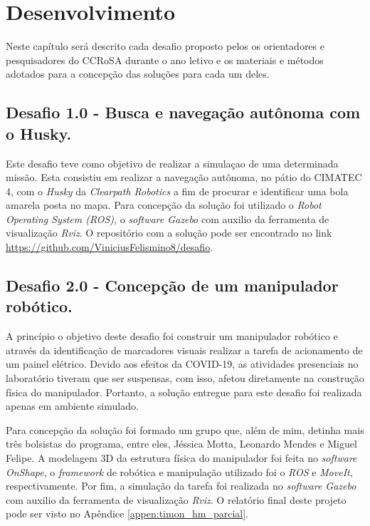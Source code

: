 \chapter{Desenvolvimento}
\label{chap:mat}

Neste capítulo será descrito cada desafio proposto pelos os orientadores e pesquisadores do CCRoSA durante o ano letivo e os materiais e métodos adotados para a concepção das soluções para cada um deles.

\section{Desafio 1.0 - Busca e navegação autônoma com o Husky.}

Este desafio teve como objetivo de realizar a simulaçao de uma determinada missão. Esta consistiu em realizar a navegação autônoma, no pátio do CIMATEC 4, com o \textit{Husky} da \textit{Clearpath Robotics} a fim de procurar e identificar uma bola amarela posta no mapa. Para concepção da solução foi utilizado o \textit{Robot Operating System (ROS)}, o \textit{software Gazebo} com auxilio da ferramenta de visualização \textit{Rviz}. O repositório com a solução pode ser encontrado no link \url{https://github.com/ViniciusFelismino8/desafio}.

\section{Desafio 2.0 - Concepção de um manipulador robótico.}
\label{sec:desafio2.0}

A princípio o objetivo deste desafio foi construir um manipulador robótico e através da identificação de marcadores visuais realizar a tarefa de acionamento de um painel elétrico. Devido aos efeitos da COVID-19, as atividades presenciais no laboratório tiveram que ser suspensas, com isso, afetou diretamente na construção física do manipulador. Portanto, a solução entregue para este desafio foi realizada apenas em ambiente simulado. 

Para concepção da solução foi formado um grupo que, além de mim, detinha mais três bolsistas do programa, entre eles, Jéssica Motta, Leonardo Mendes e Miguel Felipe. A modelagem 3D da estrutura física do manipulador foi feita no \textit{software OnShape}, o \textit{framework} de robótica e manipulação utilizado foi o \textit{ROS} e \textit{MoveIt}, respectivamente. Por fim, a simulação da tarefa foi realizada no \textit{software Gazebo} com auxilio da ferramenta de visualização \textit{Rviz}. O relatório final deste projeto pode ser visto no Apêndice \ref{appen:timon_hm_parcial}.

